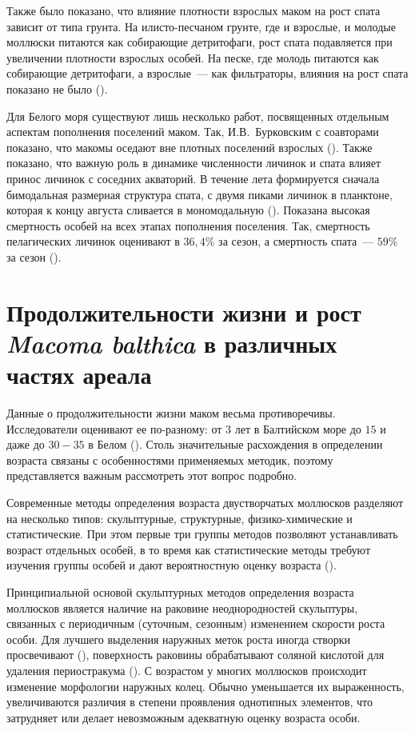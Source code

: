  Также было показано, что влияние плотности взрослых маком на рост спата зависит от типа грунта. 
На илисто-песчаном грунте, где и взрослые, и молодые моллюски питаются как собирающие детритофаги, рост спата подавляется при увеличении плотности взрослых особей. 
На песке, где молодь питаются как собирающие детритофаги, а взрослые~--- как фильтраторы, влияния на рост спата показано не было (\cite{Olafsson_1989}).

Для Белого моря существуют лишь несколько работ, посвященных отдельным аспектам пополнения поселений маком. 
Так, И.\:В.~Бурковским с соавторами показано, что макомы оседают вне плотных поселений взрослых (\cite{Burkovskiy_et_al_1998}). 
Также показано, что важную роль в динамике численности личинок и спата влияет принос личинок с соседних акваторий. 
В течение лета формируется сначала бимодальная размерная структура спата, с двумя пиками личинок в планктоне, которая к концу августа сливается в мономодальную (\cite{Zubakha_et_al_2000}). 
Показана высокая смертность особей на всех этапах пополнения поселения. Так, смертность пелагических личинок оценивают в $36,4$\% за сезон, а смертность спата~--- $59$\% за сезон (\cite{Burkovskiy_et_al_1998}).


		\section{Продолжительности жизни и рост {\it Macoma balthica} в различных частях ареала}
Данные о продолжительности жизни маком весьма противоречивы. 
Исследователи оценивают ее по-разному: от $3$ лет в Балтийском море до $15$ и даже до $30-35$ в Белом  (\cite{Segerstrale_1960, Semenova_1970, Maximovich_Kunina_1982}). 
Столь значительные расхождения в определении возраста связаны с особенностями применяемых методик, поэтому представляется важным рассмотреть этот вопрос подробно.

Современные методы определения возраста двустворчатых моллюсков разделяют на несколько типов: скульптурные, структурные, физико-химические и статистические. 
При этом первые три группы методов позволяют устанавливать возраст отдельных особей, в то время как статистические методы требуют изучения группы особей и дают вероятностную оценку возраста (\cite{Zolotarev_1989}). 

Принципиальной основой скульптурных методов определения возраста моллюсков является наличие на раковине неоднородностей скульптуры, связанных с периодичным (суточным, сезонным) изменением скорости роста особи. 
Для лучшего выделения наружных меток роста иногда створки просвечивают (\cite{Brousseau_1979}), поверхность раковины обрабатывают соляной кислотой для удаления периостракума (\cite{Tabunkov_1974}). 
С возрастом у многих моллюсков происходит изменение морфологии наружных колец. 
Обычно уменьшается их выраженность, увеличиваются различия в степени проявления однотипных элементов, что затрудняет или делает невозможным адекватную оценку возраста особи. 	

